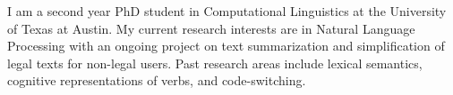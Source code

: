 %
%
%
\par{
I am a second year PhD student in Computational Linguistics at the University of Texas at Austin. My current research interests are in Natural Language Processing with an ongoing project on text summarization and simplification of legal texts for non-legal users. Past research areas include lexical semantics, cognitive representations of verbs, and code-switching.
}